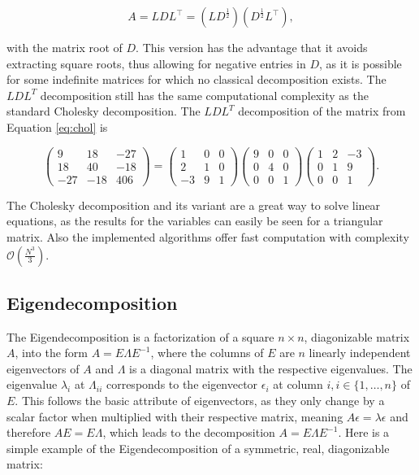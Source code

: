 \begin{equation}\label{eq:LDL}
  A = LDL^\top = (L D^\frac{1}{2}) (D^\frac{1}{2}  L^\top),
\end{equation}

\noindent with the matrix root of $D$. This version has the advantage
that it avoids extracting square roots, thus allowing for negative
entries in $D$, as it is possible for some indefinite matrices for which
no classical decomposition exists. The $LDL^T$ decomposition still has
the same computational complexity as the standard Cholesky
decomposition. The $LDL^T$ decomposition of the matrix from Equation
\ref{eq:chol} is

\begin{equation}
  \begin{pmatrix}
    9 & 18 & -27\\
    18 & 40 & -18 \\
    -27 & -18 & 406
  \end{pmatrix}
  =
  \begin{pmatrix}
    1 & 0 & 0\\
    2 & 1 & 0 \\
    -3 & 9 & 1
  \end{pmatrix}
  \begin{pmatrix}
    9 & 0 & 0\\
    0 & 4 & 0 \\
    0 & 0 & 1
  \end{pmatrix}
  \begin{pmatrix}
    1 & 2 & -3\\
    0 & 1 & 9 \\
    0 & 0 & 1
  \end{pmatrix}
  .
\end{equation}

\noindent The Cholesky decomposition and its variant are a great way to
solve linear equations, as the results for the variables can easily be
seen for a triangular matrix. Also the implemented algorithms offer
fast computation with complexity $\mathcal{O}(\frac{N^3}{3})$.

\subsection{Eigendecomposition}\label{sec:eigen}

The Eigendecomposition is a factorization of a square $n \times n$,
diagonizable matrix $A$, into the form $A = E \Lambda E^{-1}$, where the
columns of $E$ are $n$ linearly independent eigenvectors of $A$ and
$\Lambda$ is a diagonal matrix with the respective eigenvalues. The
eigenvalue $\lambda_i$ at $\Lambda_{ii}$ corresponds to the eigenvector
$\epsilon_i$ at column $i, i \in \{1,\dots,n\}$ of $E$. This follows the
basic attribute of eigenvectors, as they only change by a scalar factor
when multiplied with their respective matrix, meaning $A \epsilon =
\lambda \epsilon$ and therefore $A E = E \Lambda$, which leads to the
decomposition $A = E \Lambda E^{-1}$. Here is a simple example of the
Eigendecomposition of a symmetric, real, diagonizable matrix:

